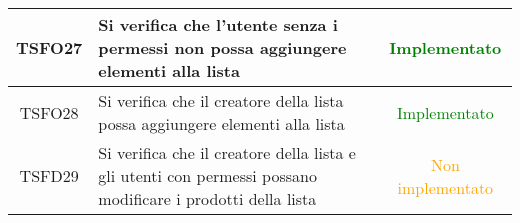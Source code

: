 \begin{center}
\begin{longtable}{|c|>{\centering}m{10cm}|c|}
		TSFO27 & Si verifica che l'utente senza i permessi non possa aggiungere elementi alla lista & \textcolor{Green}{Implementato}\\ \hline
		TSFO28 & Si verifica che il creatore della lista possa aggiungere elementi alla lista & \textcolor{Green}{Implementato}\\ \hline
		TSFD29 & Si verifica che il creatore della lista e gli utenti con permessi possano modificare i prodotti della lista & \textcolor{Orange}{Non implementato}\\ \hline
	\end{longtable}
\end{center}

